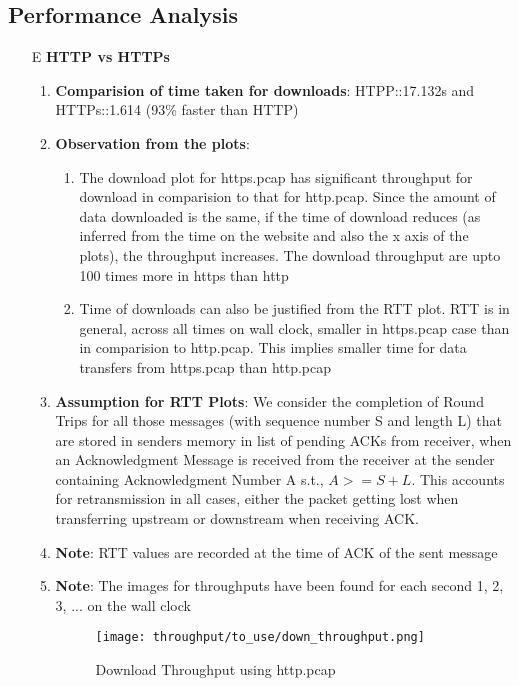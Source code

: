 \documentclass[12pt]{article}
\begin{document}
\subsection{Performance Analysis}
\begin{enumerate}
    \item[E] \textbf{HTTP vs HTTPs}
    \begin{enumerate}
        \item \textbf{Comparision of time taken for downloads}: HTPP::17.132s and HTTPs::1.614 (93\% faster than HTTP)
        \item \textbf{Observation from the plots}: 
        \begin{enumerate}
            \item The download plot for https.pcap has significant throughput for download in comparision to that for http.pcap. Since the amount of data downloaded is the same, if the time of download reduces (as inferred from the time on the website and also the x axis of the plots), the throughput    increases. The download throughput are upto 100 times more in https than http
            \item Time of downloads can also be justified from the RTT plot. RTT is in general, across all times on wall clock, smaller in https.pcap case than in comparision to http.pcap. This implies smaller time for data transfers from https.pcap than http.pcap
        \end{enumerate}
         \item \textbf{Assumption for RTT Plots}: We consider the completion of Round Trips for all those messages (with sequence number S and length L) that are stored in senders memory in list of pending ACKs from receiver, when an Acknowledgment Message is received from the receiver at the sender containing Acknowledgment Number A s.t., $A >= S + L$. This accounts for retransmission in all cases, either the packet getting lost when transferring upstream or downstream when receiving ACK.
         \item \textbf{Note}: RTT values are recorded at the time of ACK of the sent message
         \item \textbf{Note}: The images for throughputs have been found for each second {1, 2, 3, ...} on the wall clock
        \begin{figure}[h!]
            \centering
            \texttt{[image: throughput/to\_use/down\_throughput.png]}
            \caption{Download Throughput using http.pcap}
        \end{figure}

\end{enumerate}
\end{enumerate}
\end{document}
